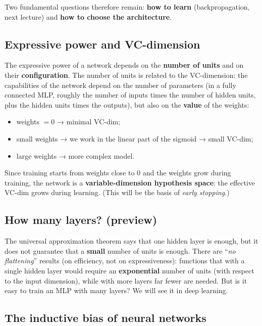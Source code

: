 Two fundamental questions therefore remain: \textbf{how to learn}
(backpropagation, next lecture) and \textbf{how to choose the
architecture}.

\subsection{Expressive power and
VC-dimension}\label{potere-espressivo-e-vc-dimension}

The expressive power of a network depends on the \textbf{number of
units} and on their \textbf{configuration}. The number of units is
related to the VC-dimension: the capabilities of the network depend on
the number of parameters (in a fully connected MLP, roughly the number
of inputs times the number of hidden units, plus the hidden units times
the outputs), but also on the \textbf{value} of the weights:

\begin{itemize}
\tightlist
\item
  weights \(= 0\) → minimal VC-dim;
\item
  small weights → we work in the linear part of the sigmoid → small
  VC-dim;
\item
  large weights → more complex model.
\end{itemize}

Since training starts from weights close to 0 and the weights grow
during training, the network is a \textbf{variable-dimension hypothesis
space}: the effective VC-dim grows during learning. (This will be the
basis of \emph{early stopping}.)

\subsection{How many layers?
(preview)}\label{quanti-strati-anticipazione}

The universal approximation theorem says that one hidden layer is
enough, but it does not guarantee that a \textbf{small} number of units
is enough. There are ``\emph{no flattening}'' results (on efficiency,
not on expressiveness): functions that with a single hidden layer
would require an \textbf{exponential} number of units (with respect to
the input dimension), while with more layers far fewer are needed. But
is it easy to train an MLP with many layers? We will see it in deep
learning.

\subsection{The inductive bias of neural
networks}\label{il-bias-induttivo-delle-reti-neurali}

